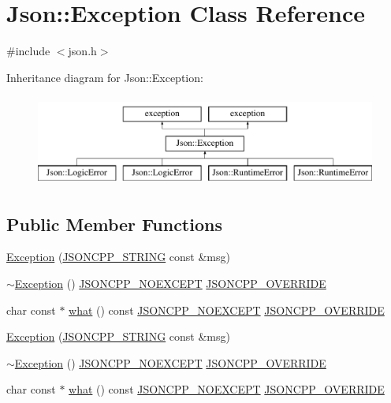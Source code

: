 \hypertarget{class_json_1_1_exception}{}\section{Json\+:\+:Exception Class Reference}
\label{class_json_1_1_exception}


{\ttfamily \#include $<$json.\+h$>$}

Inheritance diagram for Json\+:\+:Exception\+:\begin{figure}[H]
\begin{center}
\leavevmode
\includegraphics[height=3.000000cm]{class_json_1_1_exception}
\end{center}
\end{figure}
\subsection*{Public Member Functions}
\begin{DoxyCompactItemize}
\item 
\hyperlink{class_json_1_1_exception_ae764aa42e0755bd4ce9d303e2733fa8f}{Exception} (\hyperlink{config_8h_a1e723f95759de062585bc4a8fd3fa4be}{J\+S\+O\+N\+C\+P\+P\+\_\+\+S\+T\+R\+I\+NG} const \&msg)
\item 
\hyperlink{class_json_1_1_exception_add6af5e0ecdf36f40d7f3554b9786e21}{$\sim$\+Exception} () \hyperlink{config_8h_af8418c6d82d9de6e5f3c739fcf2fe88d}{J\+S\+O\+N\+C\+P\+P\+\_\+\+N\+O\+E\+X\+C\+E\+PT} \hyperlink{config_8h_a824d6199c91488107e443226fa6022c5}{J\+S\+O\+N\+C\+P\+P\+\_\+\+O\+V\+E\+R\+R\+I\+DE}
\item 
char const  $\ast$ \hyperlink{class_json_1_1_exception_a70b7ce35e761fb93e8cd338e04619cd6}{what} () const \hyperlink{config_8h_af8418c6d82d9de6e5f3c739fcf2fe88d}{J\+S\+O\+N\+C\+P\+P\+\_\+\+N\+O\+E\+X\+C\+E\+PT} \hyperlink{config_8h_a824d6199c91488107e443226fa6022c5}{J\+S\+O\+N\+C\+P\+P\+\_\+\+O\+V\+E\+R\+R\+I\+DE}
\item 
\hyperlink{class_json_1_1_exception_ae764aa42e0755bd4ce9d303e2733fa8f}{Exception} (\hyperlink{config_8h_a1e723f95759de062585bc4a8fd3fa4be}{J\+S\+O\+N\+C\+P\+P\+\_\+\+S\+T\+R\+I\+NG} const \&msg)
\item 
\hyperlink{class_json_1_1_exception_add6af5e0ecdf36f40d7f3554b9786e21}{$\sim$\+Exception} () \hyperlink{config_8h_af8418c6d82d9de6e5f3c739fcf2fe88d}{J\+S\+O\+N\+C\+P\+P\+\_\+\+N\+O\+E\+X\+C\+E\+PT} \hyperlink{config_8h_a824d6199c91488107e443226fa6022c5}{J\+S\+O\+N\+C\+P\+P\+\_\+\+O\+V\+E\+R\+R\+I\+DE}
\item 
char const  $\ast$ \hyperlink{class_json_1_1_exception_afaee052fb0c70e07a989c26ad382091c}{what} () const \hyperlink{config_8h_af8418c6d82d9de6e5f3c739fcf2fe88d}{J\+S\+O\+N\+C\+P\+P\+\_\+\+N\+O\+E\+X\+C\+E\+PT} \hyperlink{config_8h_a824d6199c91488107e443226fa6022c5}{J\+S\+O\+N\+C\+P\+P\+\_\+\+O\+V\+E\+R\+R\+I\+DE}
\end{DoxyCompactItemize}
